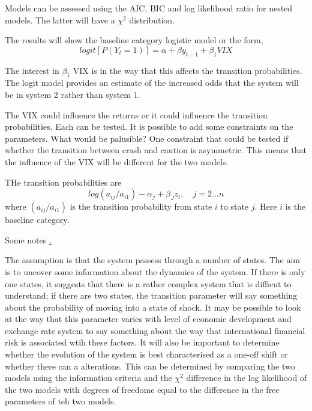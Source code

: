 \documentclass[12pt, a4paper, oneside]{article} %
\begin{document}
Models can be assessed using the AIC, BIC and log likelihood ratio for nested models.  The latter will have a $\chi^2$ distribution. 

The results will show the baseline category logistic model or the form, 
\begin{equation} 
logit[P(Y_t = 1)] = \alpha + \beta y_{t-1} + \beta_1 VIX
\end{equation}

The interest in $\beta_1$ VIX is in the way that this affects the transition probabilities.  The logit model provides an estimate of the increased odds that the system will be in system 2 rather than system 1.

The VIX could influence the returns or it could influence the transition probabilities.  Each can be tested. It is possible to add some constraints on the parameters.  What would be palusible? One constraint that could be tested if whether the transition between crash and caution is asymmetric.  This means that the influence of the VIX will be different for the two models.  

THe transition probabilities are
\begin{equation}
log(a_{ij}/a_{i1}) - \alpha_j +\beta_J z_t, \quad j = 2\dots n
\end{equation} 
where $(a_{ij}/a_{i1})$ is the transition probability from state $i$ to state $j$.  Here $i$ is the baseline category. 

Some notes \href{https://onlinecourses.science.psu.edu/stat504/node/174}.

The assumption is that the system passess through a number of states.  The aim is to uncover some information about the dynamics of the system.  If there is only one states,  it suggests that there is a rather complex system that is difficut to understand; if there are two states, the transition parameter will say something about the probability of moving into a state of shock.  It may be possible to look at the way that this parameter varies with level of economic development and exchange rate system to say something about the way that international financial risk is associated wtih these factors.  It will also be important to determine whether the evolution of the system is best characterised as a one-off shift or whether there can a alterations.  This can be determined by comparing the two models using the information criteria and the $\chi^2$ difference in the log likelihood of the two models with degrees of freedome equal to the difference in the free parameters of teh two models. 
\end{document}
